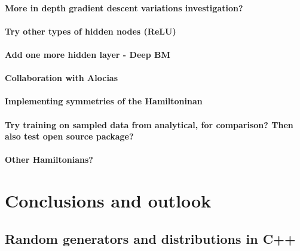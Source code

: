 \documentclass[twoside,english]{uiofysmaster}
\begin{document}
\subsection{More in depth gradient descent variations investigation?}
\subsection{Try other types of hidden nodes (ReLU)}
\subsection{Add one more hidden layer - Deep BM}
\subsection{Collaboration with Alocias}
\subsection{Implementing symmetries of the Hamiltoninan}
\subsection{Try training on sampled data from analytical, for comparison? Then also test open source package?}
\subsection{Other Hamiltonians?}

\part{Conclusions and outlook}

\begin{appendices}
\chapter{Random generators and distributions in C++}
\end{appendices}

\newpage

\end{document}

